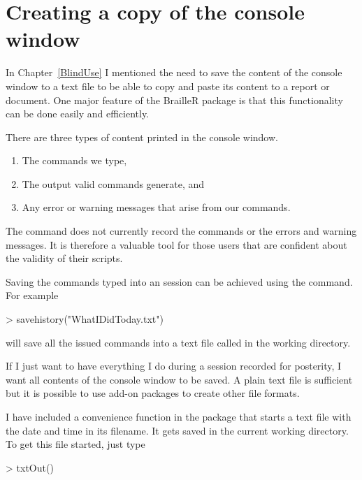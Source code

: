  
\section{Creating a copy of the \R{} console window}\label{CreateCopyConsole} 
 
In Chapter~\ref{BlindUse} I mentioned the need to save the content of the console window to a text file to be able to copy and paste its content to a report or document. One major feature of the BrailleR package is that this functionality can be done easily and efficiently. 
 
There are three types of content printed in the console window.\begin{enumerate} 
\item The commands we type, 
\item The output valid commands generate, and 
\item Any error or warning messages that arise from our commands. 
\end{enumerate} 
 
The  command does not currently record the commands or the errors and warning messages. It is therefore a valuable tool for those \R{} users that are confident about the validity of their scripts. 
 
Saving the commands typed into an \R{} session can be achieved using the  command. For example 

\begin{Schunk}
\begin{Sinput}
> savehistory("WhatIDidToday.txt") 
\end{Sinput}
\end{Schunk}

will save all the issued commands into a text file called  in the working directory.  
 
If I just want to have everything I do during a session recorded for posterity, I want all contents of the console window to be saved. A plain text file is sufficient but it is possible to use add-on packages to create other file formats. 
 
I have included a convenience function in the  package that starts a text file with the date and time in its filename. It gets saved in the current working directory. To get this file started, just type 

\begin{Schunk}
\begin{Sinput}
> txtOut() 
\end{Sinput}
\end{Schunk}

